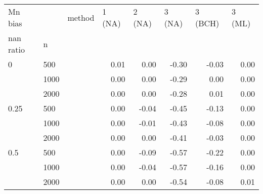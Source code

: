 \documentclass{article}
\begin{document}
\begin{table}[ht]
  \centering
  \begin{tabular}{lll |rrrrr}
  \hline
 Mn bias          &      & method & \multicolumn{1}{l}{ 1 (NA)} & \multicolumn{1}{l}{ 2 (NA)} & \multicolumn{1}{l}{ 3 (NA)} & \multicolumn{1}{l}{ 3 (BCH)} & \multicolumn{1}{l}{ 3 (ML)} \\ 
  nan ratio & n    &        & \multicolumn{1}{l}{       } & \multicolumn{1}{l}{       } & \multicolumn{1}{l}{       } & \multicolumn{1}{l}{        } & \multicolumn{1}{l}{       } \\ 
   \hline
0         & 500  &        &   0.01 &   0.00 &  -0.30 &   -0.03 &   0.00 \\ 
            & 1000 &        &   0.00 &   0.00 &  -0.29 &    0.00 &   0.00 \\ 
            & 2000 &        &   0.00 &   0.00 &  -0.28 &    0.01 &   0.00 \\ 
  0.25      & 500  &        &   0.00 &  -0.04 &  -0.45 &   -0.13 &   0.00 \\ 
            & 1000 &        &   0.00 &  -0.01 &  -0.43 &   -0.08 &   0.00 \\ 
            & 2000 &        &   0.00 &   0.00 &  -0.41 &   -0.03 &   0.00 \\ 
  0.5       & 500  &        &   0.00 &  -0.09 &  -0.57 &   -0.22 &   0.00 \\ 
            & 1000 &        &   0.00 &  -0.04 &  -0.57 &   -0.16 &   0.00 \\ 
            & 2000 &        &   0.00 &   0.00 &  -0.54 &   -0.08 &   0.01 \\ 
   \hline
  \end{tabular}


\end{table}
\end{document}
